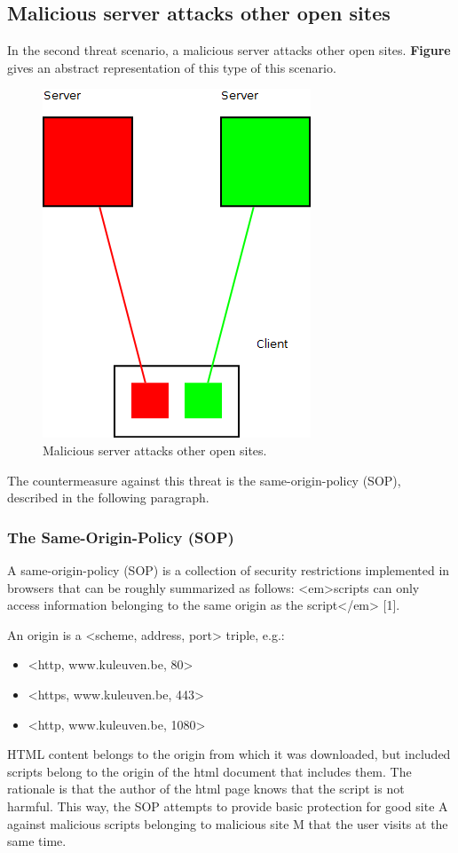 \subsection{Malicious server attacks other open sites}

In the second threat scenario, a malicious server attacks other open sites. \textbf{Figure} gives an abstract representation of this type of this scenario.

\begin{figure}[H]
	\begin{center}		
		\includegraphics[width=0.3\columnwidth]{img/security/threat-scenario-bad-server-attacks-open-sites}
		\caption{Malicious server attacks other open sites.}
		\label{fig:threat-scenario:bad-server-attacks-open-sites}
	\end{center}
\end{figure}


The countermeasure against this threat is the same-origin-policy (SOP), described in the following paragraph.


\subsubsection{The Same-Origin-Policy (SOP)}

A same-origin-policy (SOP) is a collection of security restrictions implemented in browsers that can be roughly summarized as follows: <em>scripts can only access information belonging to the same origin as the script</em> [1].

An origin is a <scheme, address, port> triple, e.g.:
\begin{itemize}
	\item <http, www.kuleuven.be, 80>
	\item <https, www.kuleuven.be, 443>
	\item <http, www.kuleuven.be, 1080>
\end{itemize}

HTML content belongs to the origin from which it was downloaded, but included scripts belong to the origin of the html document that includes them. The rationale is that the author of the html page knows that the script is not harmful. This way, the SOP attempts to provide basic protection for good site A against malicious scripts belonging to malicious site M that the user visits at the same time.

